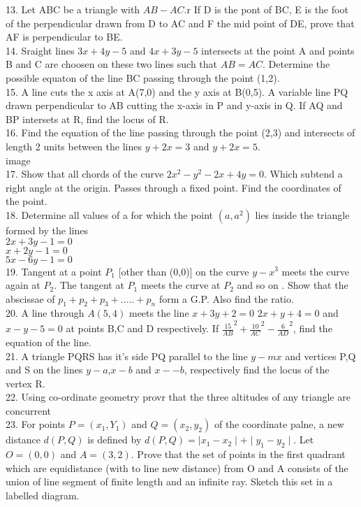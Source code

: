 \documentclass[12pt]{article}
\begin{document}
13. Let ABC be a triangle with $AB-AC$.r If D is the pont of BC, E is the foot of the perpendicular drawn from D to AC and F the mid point of DE, prove that AF is perpendicular to BE.\\
14. Sraight lines $3x+4y-5$ and $4x+3y-5$ intersects at the point A and points B and C 
are choosen on these two lines such that $AB=AC$. Determine the possible equaton of the line BC passing through the point (1,2).\\
15. A line cuts the x axis at A(7,0) and the y axis at B(0,5). A variable line PQ drawn perpendicular to AB cutting the x-axis  in P and y-axis in Q. If AQ and BP intersets at R, find the locus of R.\\
16. Find the equation of the line passing through the point (2,3) and intersects of length 2 units between the lines $y+2x=3$ and $y+2x=5$.\\
image\\
17. Show that all chords of the curve  $2x^2-y^2-2x+4y=0$. Which subtend a right angle at the origin. Passes through a fixed point. Find the coordinates of the point.\\
18. Determine all values of a for which the point $(a, a^2)$ lies inside the triangle formed by the lines\\
$2x+3y-1=0$\\
$x+2y-1=0$\\
$5x-6y-1=0$\\
19. Tangent at a point $P_1$ [other than (0,0)] on the curve $y-x^3$ meets the curve again at $P_2$. The tangent at $P_1$ meets the curve at $P_2$ and so on . Show that the abscissae of $p_1+p_2+p_3+.....+p_n$ form a G.P. Also find the ratio.\\
20. A line through $A(5,4)$ meets the line $x+3y+2=0$ $2x+y+4=0$ and $x-y-5=0$ at points B,C and D respectively. If    $\frac{15}{AB}^2+\frac{10}{AC}^2-\frac{6}{AD}^2$, find the equation of the line.\\
21. A triangle PQRS has it's side PQ parallel to the line $y-mx$ and vertices P,Q and S on the lines $y-a$,$ x-b$ and $x--b$, respectively find the locus of the vertex R.\\
22. Using co-ordinate geometry provr that the three altitudes of any triangle are concurrent\\
23. For points $P=(x_1,Y_1)$ and $Q=(x_2,y_2)$ of the coordinate palne, a new distance $d(P,Q)$ is defined by $d(P,Q)=\mid x_1-x_2\mid + \mid y_1-y_2\mid$. Let $O=(0,0)$  and $A=(3,2)$. Prove that the set of points in the first quadrant which are equidistance (with to line new distance) from O and A consists of the union of line segment of finite length and an infinite ray. Sketch this set in a labelled diagram.\\
\end{document}
